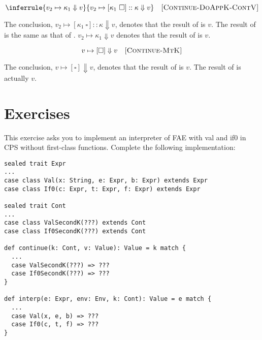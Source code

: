 \[
  \inferrule
  { v_2\mapsto\kappa_1\Downarrow v }
  { v_2\mapsto[\kappa_1\ \square]::\kappa\Downarrow v }
  \quad\textsc{[Continue-DoAppK-ContV]}
\]

The conclusion, $v_2\mapsto[\kappa_1\ \square]::\kappa\Downarrow v$, denotes that
the result of 
is $v$. The result of  is the same as that of .
$v_2\mapsto\kappa_1\Downarrow v$ denotes that the result of
 is $v$.

\[
  v\mapsto[\square]\Downarrow v
  \quad\textsc{[Continue-MtK]}
\]

The conclusion, $v\mapsto[\square]\Downarrow v$, denotes that the result of
 is $v$. The result of  is
actually $v$.

\section{Exercises}

\begin{exercise}

This exercise asks you to implement an interpreter of \textsf{FAE}
with \textsf{val} and \textsf{if0} in CPS without first-class functions.
Complete the following implementation:

\begin{verbatim}
sealed trait Expr
...
case class Val(x: String, e: Expr, b: Expr) extends Expr
case class If0(c: Expr, t: Expr, f: Expr) extends Expr

sealed trait Cont
...
case class ValSecondK(???) extends Cont
case class If0SecondK(???) extends Cont

def continue(k: Cont, v: Value): Value = k match {
  ...
  case ValSecondK(???) => ???
  case If0SecondK(???) => ???
}

def interp(e: Expr, env: Env, k: Cont): Value = e match {
  ...
  case Val(x, e, b) => ???
  case If0(c, t, f) => ???
}
\end{verbatim}

\end{exercise}

